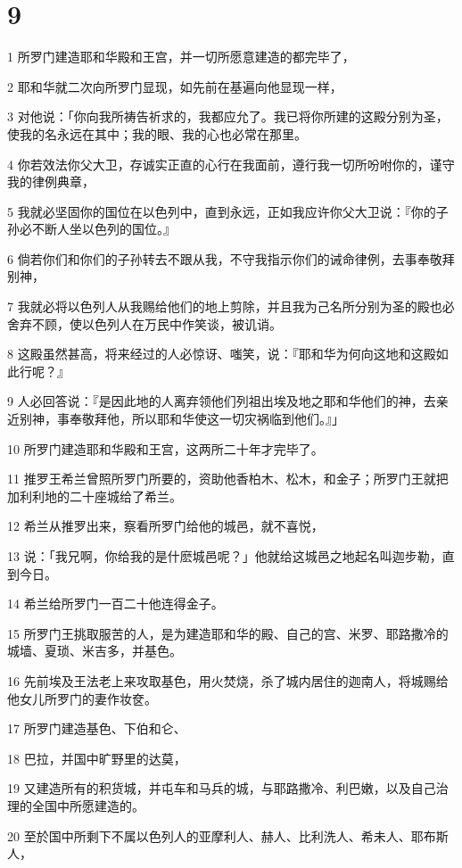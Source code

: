 \chapter{9}

\par 1 所罗门建造耶和华殿和王宫，并一切所愿意建造的都完毕了，
\par 2 耶和华就二次向所罗门显现，如先前在基遍向他显现一样，
\par 3 对他说：「你向我所祷告祈求的，我都应允了。我已将你所建的这殿分别为圣，使我的名永远在其中；我的眼、我的心也必常在那里。
\par 4 你若效法你父大卫，存诚实正直的心行在我面前，遵行我一切所吩咐你的，谨守我的律例典章，
\par 5 我就必坚固你的国位在以色列中，直到永远，正如我应许你父大卫说：『你的子孙必不断人坐以色列的国位。』
\par 6 倘若你们和你们的子孙转去不跟从我，不守我指示你们的诫命律例，去事奉敬拜别神，
\par 7 我就必将以色列人从我赐给他们的地上剪除，并且我为己名所分别为圣的殿也必舍弃不顾，使以色列人在万民中作笑谈，被讥诮。
\par 8 这殿虽然甚高，将来经过的人必惊讶、嗤笑，说：『耶和华为何向这地和这殿如此行呢？』
\par 9 人必回答说：『是因此地的人离弃领他们列祖出埃及地之耶和华他们的神，去亲近别神，事奉敬拜他，所以耶和华使这一切灾祸临到他们。』」
\par 10 所罗门建造耶和华殿和王宫，这两所二十年才完毕了。
\par 11 推罗王希兰曾照所罗门所要的，资助他香柏木、松木，和金子；所罗门王就把加利利地的二十座城给了希兰。
\par 12 希兰从推罗出来，察看所罗门给他的城邑，就不喜悦，
\par 13 说：「我兄啊，你给我的是什麽城邑呢？」他就给这城邑之地起名叫迦步勒，直到今日。
\par 14 希兰给所罗门一百二十他连得金子。
\par 15 所罗门王挑取服苦的人，是为建造耶和华的殿、自己的宫、米罗、耶路撒冷的城墙、夏琐、米吉多，并基色。
\par 16 先前埃及王法老上来攻取基色，用火焚烧，杀了城内居住的迦南人，将城赐给他女儿所罗门的妻作妆奁。
\par 17 所罗门建造基色、下伯和仑、
\par 18 巴拉，并国中旷野里的达莫，
\par 19 又建造所有的积货城，并屯车和马兵的城，与耶路撒冷、利巴嫩，以及自己治理的全国中所愿建造的。
\par 20 至於国中所剩下不属以色列人的亚摩利人、赫人、比利洗人、希未人、耶布斯人，
